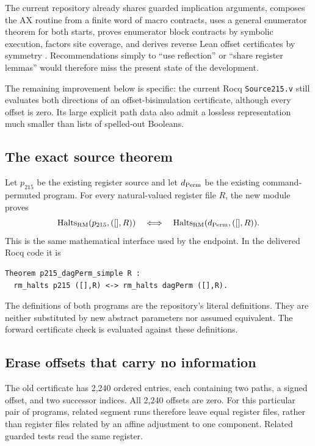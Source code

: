 \documentclass[11pt]{article}
\theoremstyle{remark}\newtheorem{remark}[theorem]{Remark}
\newcommand{\Halts}{\operatorname{Halts}}
\newcommand{\code}[1]{\texttt{\small #1}}
\begin{document}
The current repository already shares guarded implication arguments, composes the AX routine from a finite word of macro contracts, uses a general enumerator theorem for both starts, proves enumerator block contracts by symbolic execution, factors site coverage, and derives reverse Lean offset certificates by symmetry \cite{simplification}. Recommendations simply to ``use reflection'' or ``share register lemmas'' would therefore miss the present state of the development.

The remaining improvement below is specific: the current Rocq \code{Source215.v} still evaluates both directions of an offset-bisimulation certificate, although every offset is zero. Its large explicit path data also admit a lossless representation much smaller than lists of spelled-out Booleans.

\subsection{The exact source theorem}

Let $p_{215}$ be the existing register source and let $d_{\rm Perm}$ be the existing command-permuted program. For every natural-valued register file $R$, the new module proves
\begin{equation}\label{eq:source}
 \Halts_{\rm RM}(p_{215},([],R))
 \quad\Longleftrightarrow\quad
 \Halts_{\rm RM}(d_{\rm Perm},([],R)).
\end{equation}
This is the same mathematical interface used by the endpoint. In the delivered Rocq code it is
\begin{lstlisting}
Theorem p215_dagPerm_simple R :
  rm_halts p215 ([],R) <-> rm_halts dagPerm ([],R).
\end{lstlisting}
The definitions of both programs are the repository's literal definitions. They are neither substituted by new abstract parameters nor assumed equivalent. The forward certificate check is evaluated against these definitions.

\subsection{Erase offsets that carry no information}

The old certificate has 2,240 ordered entries, each containing two paths, a signed offset, and two successor indices. All 2,240 offsets are zero. For this particular pair of programs, related segment runs therefore leave equal register files, rather than register files related by an affine adjustment to one component. Related guarded tests read the same register.
\end{document}

